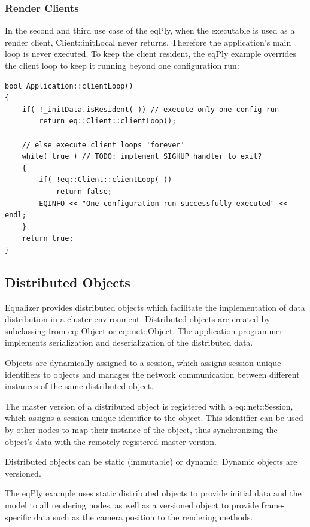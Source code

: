 \documentclass[10pt,a4]{scrartcl}
\begin{document}
\subsubsection{Render Clients}

In the second and third use case of the \textsf{eqPly}, when the
executable is used as a render client, \textsf{Client::initLocal} never
returns. Therefore the application's main loop is never executed. To
keep the client resident, the \textsf{eqPly} example overrides the
client loop to keep it running beyond one configuration run:

{\footnotesize\begin{lstlisting}
bool Application::clientLoop()
{
    if( !_initData.isResident( )) // execute only one config run
        return eq::Client::clientLoop();

    // else execute client loops 'forever'
    while( true ) // TODO: implement SIGHUP handler to exit?
    {
        if( !eq::Client::clientLoop( ))
            return false;
        EQINFO << "One configuration run successfully executed" << endl;
    }
    return true;
}
\end{lstlisting}}%


\subsection{\label{sNetObject}Distributed Objects}

Equalizer provides distributed objects which facilitate the
implementation of data distribution in a cluster
environment. Distributed objects are created by subclassing from
\textsf{eq::Object} or \textsf{eq::net::Object}. The application
programmer implements serialization and deserialization of the
distributed data.

Objects are dynamically assigned to a session, which assigns
session-unique identifiers to objects and manages the network
communication between different instances of the same distributed
object.

The master version of a distributed object is registered with a
\textsf{eq::net::Session}, which assigns a session-unique identifier to
the object. This identifier can be used by other nodes to map their
instance of the object, thus synchronizing the object's data with the
remotely registered master version.

Distributed objects can be static (immutable) or dynamic. Dynamic
objects are versioned.

The \textsf{eqPly} example uses static distributed objects to provide
initial data and the model to all rendering nodes, as well as a
versioned object to provide frame-specific data such as the camera
position to the rendering methods.
\end{document}
